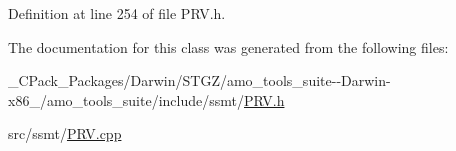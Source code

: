 Definition at line 254 of file P\+R\+V.\+h.



The documentation for this class was generated from the following files\+:\begin{DoxyCompactItemize}
\item 
\+\_\+\+C\+Pack\+\_\+\+Packages/\+Darwin/\+S\+T\+G\+Z/amo\+\_\+tools\+\_\+suite-\/-\/\+Darwin-\/x86\+\_/amo\+\_\+tools\+\_\+suite/include/ssmt/\hyperlink{___c_pack___packages_2_darwin_2_s_t_g_z_2amo__tools__suite--_darwin-x86__64_2amo__tools__suite_2include_2ssmt_2_p_r_v_8h}{P\+R\+V.\+h}\item 
src/ssmt/\hyperlink{_p_r_v_8cpp}{P\+R\+V.\+cpp}\end{DoxyCompactItemize}
